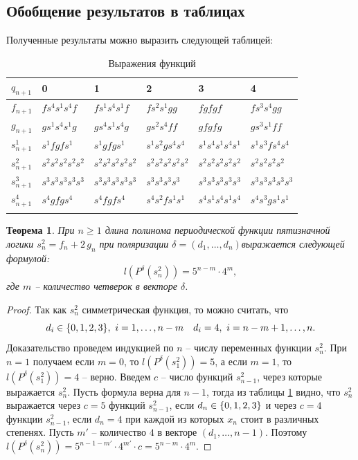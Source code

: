 \documentclass[bibliography=totoc, a4paper, 14pt]{extarticle}
\newtheorem{myth}{Теорема}
\def\in{\mathchar"3232\nobreak\discretionary{}{\usefont{OMS}{cmsy}{m}{n}\char50}{}}
\begin{document}
\subsection{Обобщение результатов в таблицах}
Полученные результаты можно выразить следующей таблицей:
\begin{center}
\begin{longtable}[h]{| l | l | l | l | l | l |}

\hline $q_{n+1}$ & 0 & 1 & 2 & 3 & 4 \\
\hline

$f_{n+1}$ & $f s^4 s^1 s^4 f$ & $f s^1 s^4 s^1 f$ & $f s^2 s^1 g g$ & $f g f g f$ & $f s^3 s^4 g g$
\\ \hline

$g_{n+1}$ & $g s^1 s^4 s^1 g$ & $g s^4 s^1 s^4 g$ & $g s^2 s^4 f f$ & $g f g f g$ & $g s^3 s^1 f f$
\\ \hline

$s^1_{n+1}$ & $s^1 f g f s^1$ & $s^1 g f g s^1$ & $s^1 s^2 g s^4 s^4$ & $s^1 s^4 s^1 s^4 s^1$ & $s^1 s^3 f s^4 s^4$
\\ \hline

$s^2_{n+1}$ & $s^2 s^2 s^2 s^2 s^2$ & $s^2 s^2 s^2 s^2 s^2$ & $s^2 s^2 s^2 s^2 s^2$ & $s^2 s^2 s^2 s^2 s^2$ & $s^2 s^2 s^2 s^2$
\\ \hline

$s^3_{n+1}$ & $s^3 s^3 s^3 s^3 s^3$ & $s^3 s^3 s^3 s^3 s^3$ & $s^3 s^3 s^3 s^3$ & $s^3 s^3 s^3 s^3 s^3$ & $s^3 s^3 s^3 s^3 s^3$
\\ \hline

$s^4_{n+1}$ & $s^4 g f g s^4$ & $s^4 f g f s^4$ & $s^4 s^2 f s^1 s^1$ & $s^4 s^1 s^4 s^1 s^4$ & $s^4 s^3 g s^1 s^1$
\\ \hline

\caption{Выражения функций}
\label{functab}
\end{longtable}
\end{center}

\begin{myth}
\label{ths2}
При $n \geqslant 1$ длина полинома периодической функции пятизначной логики ${s^2_n = f_n + 2\,g_n}$
при поляризации $\delta = (d_1,\ldots,d_n)$выражается следующей формулой:
$$ l(P^{\delta}(s^2_n)) = 5^{n-m} \cdot 4^m ,$$
где $m$ -- количество четверок в векторе $\delta$.
\end{myth}
\begin{proof}
Так как $s^2_n$ симметрическая функция, то можно считать, что
$$d_i \in \{0,1,2,3\},\ i=1,\dots,n-m \quad d_i = 4,\ i=n-m+1,\dots,n.$$
Доказательство проведем индукцией по $n$ -- числу переменных функции $s^2_n$.
При $n = 1$ получаем если $m=0$, то $l(P^{\delta}(s^2_1)) = 5$, а если $m=1$, то
$l(P^{\delta}(s^2_1))=4$ -- верно. Введем $c$ -- число функций $s^2_{n-1}$, через которые
выражается $s^2_n$. Пусть формула верна для ${n-1}$, тогда из таблицы \ref{functab} видно, что
$s^2_n$ выражается через $c=5$ функций $s^2_{n-1}$, если ${d_n \in \{0,1,2,3\}}$ и через $c=4$
функции $s^2_{n-1}$, если $d_n = 4$ при каждой из которых $x_n$ стоит в различных степенях.
Пусть $m'$ -- количество $4$ в векторе $(d_1,\dots,n-1)$.
Поэтому ${l(P^{\delta}(s^2_n)) = 5^{n-1-m'} \cdot 4^{m'} \cdot c = 5^{n-m}\cdot4^m}$.
\end{proof}
\end{document}
